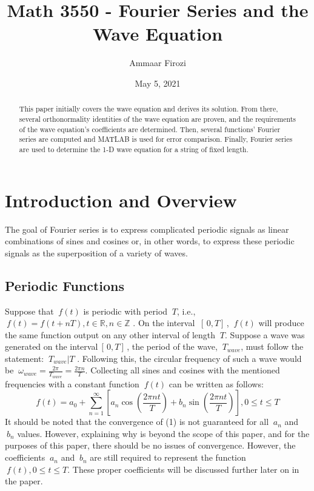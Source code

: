 \documentclass{article}
\title{Math 3550 - Fourier Series and the Wave Equation}
\author{Ammaar Firozi}
\date{May 5, 2021}
\begin{document}
\maketitle

\begin{abstract}
This paper initially covers the wave equation and derives its solution. From there, several orthonormality identities of the wave equation are proven, and the requirements of the wave equation's coefficients are determined. Then, several functions' Fourier series are computed and MATLAB is used for error comparison. Finally, Fourier series are used to determine the 1-D wave equation for a string of fixed length. 
\end{abstract}

\section{Introduction and Overview}

The goal of Fourier series is to express complicated periodic signals as linear combinations of sines and cosines or, in other words, to express these periodic signals as the superposition of a variety of waves. 

\subsection{Periodic Functions}
Suppose that $\ f(t)$ is periodic with period $\ T$, i.e., $\
f(t)=f(t+nT), t \in \mathbb{R}, n \in \mathbb{Z}$ . On the interval $\ [ \, 0, T ] \,$, $\ f(t)$ will produce the same function output on any other interval of length $\ T$. Suppose a wave was generated on the interval$\ [ \, 0, T ] \,$,  the period of the wave, $\ T_{wave}$, must follow the statement: $\ T_{wave} |  T$  . Following this, the circular frequency of such a wave would be $\ \omega_{wave}=\frac{2\pi}{T_{wave}}=\frac{2\pi n}{T}$. Collecting all sines and cosines with the mentioned frequencies with a constant function $\ f(t) $ can be written as follows:
\begin{equation}
    f(t)=a_{0}+\sum_{n=1}^{\infty} [a_{n} \cos(\frac{2\pi nt}{T})+b_{n} \sin(\frac{2\pi nt}{T})], 0 \leq t \leq T
\end{equation}
It should be noted that the convergence of (1) is not guaranteed for all $\ a_n$ and $\ b_n$ values. However, explaining why is beyond the scope of this paper, and for the purposes of this paper, there should be no issues of convergence. However, the coefficients $\ a_n$ and $\ b_n$ are still required to represent the function $\ f(t), 0 \leq t \leq T$. These proper coefficients will be discussed further later on in the paper.
\end{document}
